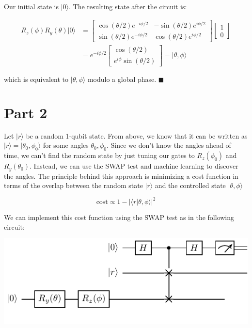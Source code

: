 \documentclass[11pt]{article}
\begin{document}
Our initial state is \(|0\rangle\). The resulting state after the circuit is:

\begin{align*}
R_z(\phi)R_y(\theta)|0\rangle &= 
\begin{bmatrix}
\cos(\theta/2)e^{-i\phi/2} & -\sin(\theta/2)e^{i\phi/2} \\
\sin(\theta/2)e^{-i\phi/2} & \cos(\theta/2)e^{i\phi/2}
\end{bmatrix}
\begin{bmatrix}
1 \\
0
\end{bmatrix} \\
&=
e^{-i\phi/2}\begin{bmatrix}
\cos(\theta/2) \\
e^{i\phi}\sin(\theta/2)
\end{bmatrix}
=
| \theta, \phi \rangle 
\end{align*}


which is equivalent to \(|\theta,\phi\rangle\) modulo a global phase. \(\blacksquare\)

\pagebreak

\section{Part 2}
\label{sec:org1e8b781}

Let \(|r\rangle\) be a random 1-qubit state. From above, we know that it can be written as \(|r\rangle = |\theta_0,\phi_0\rangle\) for some angles \(\theta_0, \phi_0\). Since we don't know the angles ahead of time, we can't find the random state by just tuning our gates to \(R_z(\phi_0)\) and \(R_y(\theta_0)\). Instead, we can use the SWAP test and machine learning to discover the angles. The principle behind this approach is minimizing a cost function in terms of the overlap between the random state \(|r\rangle\) and the controlled state \(|\theta, \phi\rangle\)

\begin{equation*}
\text{cost} \propto 1-|\langle r | \theta, \phi \rangle|^2
\end{equation*}

We can implement this cost function using the SWAP test as in the following circuit:

\begin{center}
\includegraphics[width=.9\linewidth]{circuits/total/total.pdf}
\end{center}
\end{document}
